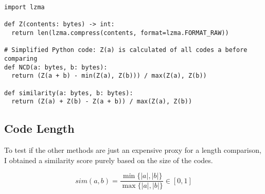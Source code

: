 \documentclass[../main.tex]{subfiles}
\begin{document}
\begin{lstlisting}[style=pymd]
import lzma

def Z(contents: bytes) -> int:
  return len(lzma.compress(contents, format=lzma.FORMAT_RAW))

# Simplified Python code: Z(a) is calculated of all codes a before comparing
def NCD(a: bytes, b: bytes):
  return (Z(a + b) - min(Z(a), Z(b))) / max(Z(a), Z(b))

def similarity(a: bytes, b: bytes):
  return (Z(a) + Z(b) - Z(a + b)) / max(Z(a), Z(b))
\end{lstlisting}

\subsection{Code Length \label{sec:size}}

To test if the other methods are just an expensive proxy for a length comparison, I obtained a similarity score purely based on the size of the codes.

\begin{equation}
  sim(a, b) = \dfrac{\min\{|a|,|b|\}}{\max\{|a|,|b|\}} \in [0,1]
  \label{eq:size}
\end{equation}
\end{document}
